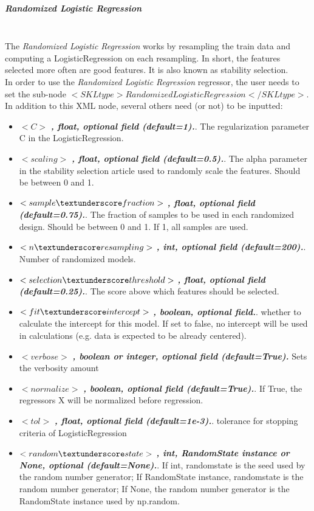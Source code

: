 \subparagraph{Randomized Logistic Regression}
\mbox{}
\\The \textit{Randomized Logistic Regression} works by resampling the train data and computing a LogisticRegression on each resampling. In short, the features selected more often are good features. It is also known as stability selection.
\\In order to use the \textit{Randomized Logistic Regression} regressor, the user needs to set the sub-node $<SKLtype>RandomizedLogisticRegression</SKLtype>$.
In addition to this XML node, several others need (or not) to be inputted:
\begin{itemize}
  \item $<C>$ \textbf{\textit{, float, optional field (default=1).}}. The regularization parameter C in the LogisticRegression.
  \item $<scaling>$ \textbf{\textit{, float, optional field (default=0.5).}}. The alpha parameter in the stability selection article used to randomly scale the features. Should be between 0 and 1.
  \item $<sample\textunderscore fraction>$ \textbf{\textit{, float, optional field (default=0.75).}}. The fraction of samples to be used in each randomized design. Should be between 0 and 1. If 1, all samples are used.
  \item $<n\textunderscore resampling>$ \textbf{\textit{, int, optional field (default=200).}}. Number of randomized models.
  \item $<selection\textunderscore threshold>$ \textbf{\textit{, float, optional field (default=0.25).}}. The score above which features should be selected.
  \item $<fit\textunderscore intercept>$ \textbf{\textit{, boolean, optional field.}}. whether to calculate the intercept for this model. If set to false, no intercept will be used in calculations (e.g. data is expected to be already centered).
  \item $<verbose>$ \textbf{\textit{, boolean or integer, optional field (default=True).}} Sets the verbosity amount
  \item $<normalize>$ \textbf{\textit{, boolean, optional field (default=True).}}. If True, the regressors X will be normalized before regression.
  \item $<tol>$ \textbf{\textit{, float, optional field (default=1e-3).}}. tolerance for stopping criteria of LogisticRegression
  \item $<random\textunderscore state>$ \textbf{\textit{, int, RandomState instance or None, optional (default=None).}}. If int, random\textunderscore state is the seed used by the random number generator; If RandomState instance, random\textunderscore state is the random number generator; If None, the random number generator is the RandomState instance used by np.random.
\end{itemize}

